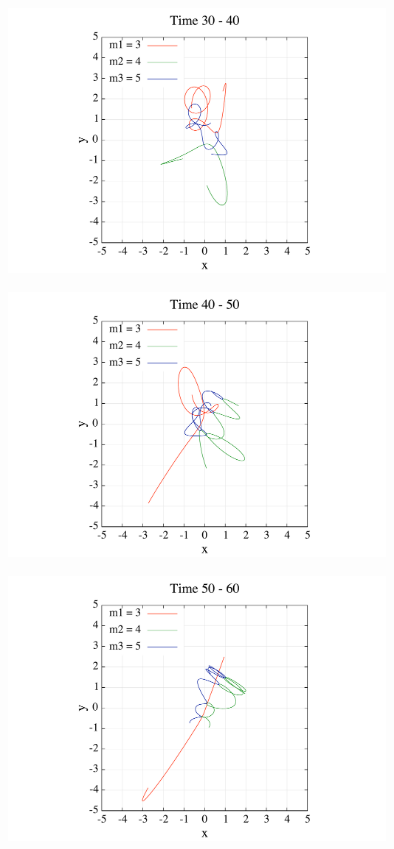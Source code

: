 \documentclass[11pt,a4paper,oneside,onecolumn]{jarticle}
\begin{document}
\begin{figure}[H]
\centering
\includegraphics[width=10cm]{./image/pythagoras_orbit_30to40.pdf}
\caption{\label{}}
\end{figure}

\begin{figure}[H]
\centering
\includegraphics[width=10cm]{./image/pythagoras_orbit_40to50.pdf}
\caption{\label{}}
\end{figure}

\begin{figure}[H]
\centering
\includegraphics[width=10cm]{./image/pythagoras_orbit_50to60.pdf}
\caption{\label{}}
\end{figure}
\end{document}
